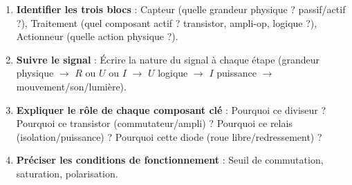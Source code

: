 \documentclass[11pt]{article}
\begin{document}
\begin{methode}
\begin{enumerate}
\item \textbf{Identifier les trois blocs} : Capteur (quelle grandeur physique ? passif/actif ?), Traitement (quel composant actif ? transistor, ampli-op, logique ?), Actionneur (quelle action physique ?).
\item \textbf{Suivre le signal} : Écrire la nature du signal à chaque étape (grandeur physique $\rightarrow$ $R$ ou $U$ ou $I$ $\rightarrow$ $U$ logique $\rightarrow$ $I$ puissance $\rightarrow$ mouvement/son/lumière).
\item \textbf{Expliquer le rôle de chaque composant clé} : Pourquoi ce diviseur ? Pourquoi ce transistor (commutateur/ampli) ? Pourquoi ce relais (isolation/puissance) ? Pourquoi cette diode (roue libre/redressement) ?
\item \textbf{Préciser les conditions de fonctionnement} : Seuil de commutation, saturation, polarisation.
\end{enumerate}
\end{methode}
\end{document}
